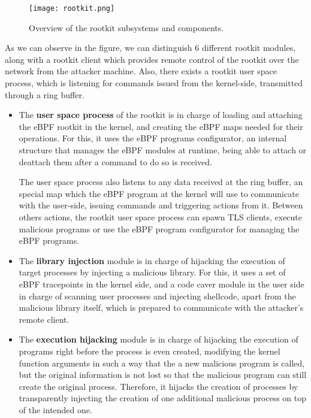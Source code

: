 \begin{figure}[htbp]
	\centering
	\texttt{[image: rootkit.png]}
	\caption{Overview of the rootkit subsystems and components.}
	\label{fig:rootkit}
\end{figure}

As we can observe in the figure, we can distinguish 6 different rootkit modules, along with a rootkit client which provides remote control of the rootkit over the network from the attacker machine. Also, there exists a rootkit user space process, which is listening for commands issued from the kernel-side, transmitted through a ring buffer.
\begin{itemize}
\item The \textbf{user space process} of the rootkit is in charge of loading and attaching the eBPF rootkit in the kernel, and creating the eBPF maps needed for their operations. For this, it uses the eBPF programs configurator, an internal structure that manages the eBPF modules at runtime, being able to attach or deattach them after a command to do so is received.

The user space process also listens to any data received at the ring buffer, an special map which the eBPF program at the kernel will use to communicate with the user-side, issuing commands and triggering actions from it. Between others actions, the rootkit user space process can spawn TLS clients, execute malicious programs or use the eBPF program configurator for managing the eBPF programs.

\item The \textbf{library injection} module is in charge of hijacking the execution of target processes by injecting a malicious library. For this, it uses a set of eBPF tracepoints in the kernel side, and a code caver module in the user side in charge of scanning user processes and injecting shellcode, apart from the malicious library itself, which is prepared to communicate with the attacker's remote client.

\item The \textbf{execution hijacking} module is in charge of hijacking the execution of programs right before the process is even created, modifying the kernel function arguments in such a way that the a new malicious program is called, but the original information is not lost so that the malicious program can still create the original process. Therefore, it hijacks the creation of processes by transparently injecting the creation of one additional malicious process on top of the intended one.


\end{itemize}
